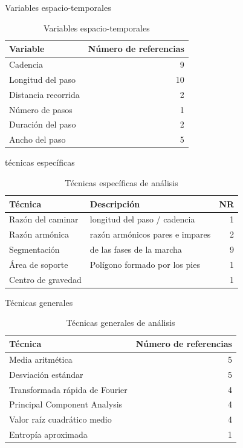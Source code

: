\documentclass{beamer} %
\begin{document}
\begin{frame}{Variables espacio-temporales}
 \begin{table}
    \centering
    \caption{Variables espacio-temporales}
    \label{tab:espacio-temp}
    \begin{tabular}{lr}
        \toprule
        Variable & Número de referencias \\
        \midrule
        Cadencia & 9 \\
        Longitud del paso & 10 \\
        Distancia recorrida & 2 \\
        Número de pasos & 1 \\
        Duración del paso & 2 \\
        Ancho del paso & 5 \\
        \bottomrule
    \end{tabular}
\end{table}
\end{frame}

\begin{frame}{técnicas específicas}
 \begin{table}
    \centering
    \caption{Técnicas específicas de análisis}
    \label{tab:tec-especificas}
    \begin{tabular}{llr}
        \toprule
        Técnica & Descripción & NR \\
        \midrule
        Razón del caminar & longitud del paso / cadencia & 1 \\
        Razón armónica    & razón armónicos pares e impares & 2 \\
        Segmentación      & de las fases de la marcha       & 9 \\
        Área de soporte   & Polígono formado por los pies & 1 \\
        Centro de gravedad &  & 1 \\
        \bottomrule
    \end{tabular}
\end{table}
\end{frame}

\begin{frame}{Técnicas generales}
\begin{table}
    \centering
    \caption{Técnicas generales de análisis}
    \label{tab:tec-generales}
    \begin{tabular}{lr}
        \toprule
        Técnica & Número de referencias \\
        \midrule
        Media aritmética & 5 \\
        Desviación estándar & 5 \\
        Transformada rápida de Fourier & 4 \\
        Principal Component Analysis & 4 \\
        Valor raíz cuadrático medio & 4 \\
        Entropía aproximada         & 1 \\
        \bottomrule
    \end{tabular}
\end{table}
\end{frame}
\end{document}
